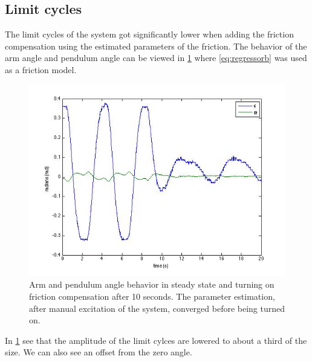 \documentclass[10pt,a4paper]{article}
\begin{document}
\subsection{Limit cycles}
The limit cycles of the system got significantly lower when adding the friction compensation using the estimated parameters of the friction. The behavior of the arm angle and pendulum angle can be viewed in \ref{fig:onoffcompensation} where \ref{eq:regressorb} was used as a friction model.
\begin{figure}[H]
\begin{center}
\includegraphics[scale=0.6]{plots/onoffcompensation.jpg}
\caption{Arm and pendulum angle behavior in steady state and turning on friction compensation after 10 seconds. The parameter estimation, after manual excitation of the system, converged before being turned on.}
\label{fig:onoffcompensation}
\end{center}
\end{figure}
In \ref{fig:onoffcompensation} see that the amplitude of the limit cylces are lowered to about a third of the size. We can also see an offset from the zero angle.
\end{document}
